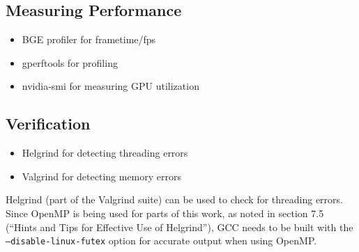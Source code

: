 \subsection{Measuring Performance}
\begin{itemize}
 \item BGE profiler for frametime/fps
 \item gperftools for profiling
 \item nvidia-smi for measuring GPU utilization
\end{itemize}

\subsection{Verification}
\begin{itemize}
 \item Helgrind for detecting threading errors
 \item Valgrind for detecting memory errors
\end{itemize}

Helgrind (part of the Valgrind suite\cite{valgrind}) can be used to check for threading errors. Since OpenMP is being used for parts of this work, as noted in section 7.5 (``Hints and Tips for Effective Use of Helgrind'')\cite{hgmanual}, GCC needs to be built with the \texttt{--disable-linux-futex} option for accurate output when using OpenMP.

